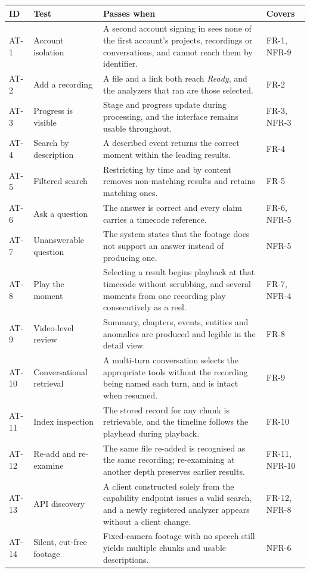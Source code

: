 \begin{table}[htbp]
\centering
\small
\begin{tabularx}{\textwidth}{@{}lL{2.9cm}XL{1.6cm}@{}}
\toprule
\textbf{ID} & \textbf{Test} & \textbf{Passes when} & \textbf{Covers} \\
\midrule
AT-1 & Account isolation & A second account signing in sees none of the first account's projects, recordings or conversations, and cannot reach them by identifier. & FR-1, NFR-9 \\
AT-2 & Add a recording & A file and a link both reach \emph{Ready}, and the analyzers that ran are those selected. & FR-2 \\
AT-3 & Progress is visible & Stage and progress update during processing, and the interface remains usable throughout. & FR-3, NFR-3 \\
AT-4 & Search by description & A described event returns the correct moment within the leading results. & FR-4 \\
AT-5 & Filtered search & Restricting by time and by content removes non-matching results and retains matching ones. & FR-5 \\
AT-6 & Ask a question & The answer is correct and every claim carries a timecode reference. & FR-6, NFR-5 \\
AT-7 & Unanswerable question & The system states that the footage does not support an answer instead of producing one. & NFR-5 \\
AT-8 & Play the moment & Selecting a result begins playback at that timecode without scrubbing, and several moments from one recording play consecutively as a reel. & FR-7, NFR-4 \\
AT-9 & Video-level review & Summary, chapters, events, entities and anomalies are produced and legible in the detail view. & FR-8 \\
AT-10 & Conversational retrieval & A multi-turn conversation selects the appropriate tools without the recording being named each turn, and is intact when resumed. & FR-9 \\
AT-11 & Index inspection & The stored record for any chunk is retrievable, and the timeline follows the playhead during playback. & FR-10 \\
AT-12 & Re-add and re-examine & The same file re-added is recognised as the same recording; re-examining at another depth preserves earlier results. & FR-11, NFR-10 \\
AT-13 & API discovery & A client constructed solely from the capability endpoint issues a valid search, and a newly registered analyzer appears without a client change. & FR-12, NFR-8 \\
AT-14 & Silent, cut-free footage & Fixed-camera footage with no speech still yields multiple chunks and usable descriptions. & NFR-6 \\
\bottomrule
\end{tabularx}
\end{table}

